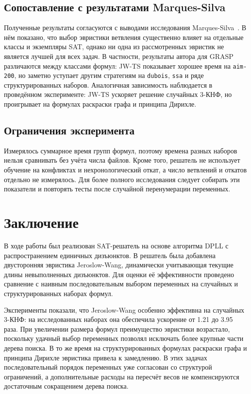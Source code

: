 \documentclass[a4paper]{article}
\begin{document}
\subsection{Сопоставление с результатами Marques-Silva}

Полученные результаты согласуются с выводами исследования
Marques-Silva~\cite{marques1999}. В нём показано, что выбор эвристики ветвления
существенно влияет на отдельные классы и экземпляры SAT, однако ни одна из
рассмотренных эвристик не является лучшей для всех задач. В частности,
результаты автора для GRASP различаются между классами формул: JW-TS показывает
хорошее время на \texttt{aim-200}, но заметно уступает другим стратегиям на
\texttt{dubois}, \texttt{ssa} и ряде структурированных наборов. Аналогичная
зависимость наблюдается в проведённом эксперименте: JW-TS ускоряет решение
случайных 3-КНФ, но проигрывает на формулах раскраски графа и принципа Дирихле.

\subsection{Ограничения эксперимента}

Измерялось суммарное время групп формул, поэтому времена разных наборов нельзя
сравнивать без учёта числа файлов. Кроме того, решатель не использует обучение
на конфликтах и нехронологический откат, а число ветвлений и откатов отдельно
не измерялось. Для более полного исследования следует собирать эти показатели
и повторять тесты после случайной перенумерации переменных.

\section{Заключение}

В ходе работы был реализован SAT-решатель на основе алгоритма DPLL с
распространением единичных дизъюнктов. В решатель была добавлена двусторонняя
эвристика Jeroslow-Wang, динамически учитывающая текущие длины невыполненных
дизъюнктов. Для оценки её эффективности проведено сравнение с наивным
последовательным выбором переменных на случайных и структурированных наборах
формул.

Эксперименты показали, что Jeroslow-Wang особенно эффективна на случайных
3-КНФ: на исследованных наборах она обеспечила ускорение от 1.21 до 3.95 раза.
При увеличении размера формул преимущество эвристики возрастало, поскольку
удачный выбор переменных позволял исключать более крупные части дерева поиска.
В то же время на структурированных формулах раскраски графа и принципа Дирихле
эвристика привела к замедлению. В этих задачах последовательный порядок
переменных уже согласован со структурой ограничений, а дополнительные расходы
на пересчёт весов не компенсируются достаточным сокращением дерева поиска.
\end{document}
